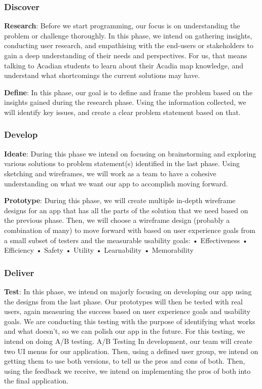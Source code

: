\documentclass[ansiapaper,12pt]{article}
\begin{document}
\subsubsection{Discover}

\textbf{Research}: Before we start programming, our focus is on understanding the problem or challenge thoroughly. In this phase, we intend on gathering insights, conducting user research, and empathising with the end-users or stakeholders to gain a deep understanding of their needs and perspectives. For us, that means talking to Acadian students to learn about their Acadia map knowledge, and understand what shortcomings the current solutions may have.

\textbf{Define}: In this phase, our goal is to define and frame the problem based on the insights gained during the research phase. Using the information collected, we will identify key issues, and create a clear problem statement based on that. 


\subsubsection{Develop}

\textbf{Ideate}: During this phase we intend on focusing on brainstorming and exploring various solutions to problem statement(s) identified in the last phase. Using sketching and wireframes, we will work as a team to have a cohesive understanding on what we want our app to accomplish moving forward.

\textbf{Prototype}: During this phase, we will create multiple in-depth wireframe designs for an app that has all the parts of the solution that we need based on the previous phase. Then, we will choose a wireframe design (probably a combination of many) to move forward with based on user experience goals from a small subset of testers and the measurable usability goals: 
• Effectiveness • Efficiency • Safety • Utility • Learnability • Memorability

\subsubsection{Deliver}

\textbf{Test}: In this phase, we intend on majorly focusing on developing our app using the designs from the last phase. Our prototypes will then be tested with real users, again measuring the success based on user experience goals and usability goals. We are conducting this testing with the purpose of identifying what works and what doesn't, so we can polish our app in the future. For this testing, we intend on doing A/B testing.
A/B Testing
In development, our team will create two UI menus for our application. Then, using a defined user group, we intend on getting them to use both versions, to tell us the pros and cons of both. Then, using the feedback we receive, we intend on implementing the pros of both into the final application.
\end{document}
